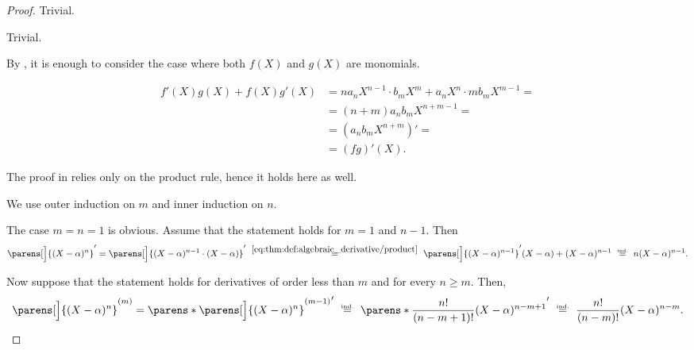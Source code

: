 \begin{proof}
   Trivial.

   Trivial.

   By , it is enough to consider the case where both \( f(X) \) and \( g(X) \) are monomials.

  \begin{align*}
    f'(X) g(X) + f(X) g'(X)
    &=
    n a_n X^{n-1} \cdot b_m X^m + a_n X^n \cdot m b_m X^{m-1}
    = \\ &=
    (n + m) a_n b_m X^{n+m-1}
    = \\ &=
    (a_n b_m X^{n+m})'
    = \\ &=
    (fg)'(X).
  \end{align*}

   The proof in  relies only on the product rule, hence it holds here as well.

   We use outer induction on \( m \) and inner induction on \( n \).

  The case \( m = n = 1 \) is obvious. Assume that the statement holds for \( m = 1 \) and \( n - 1 \). Then
  \begin{equation*}
    \parens[\Big]{ (X - \alpha)^n }'
    =
    \parens[\Big]{ (X - \alpha)^{n-1} \cdot (X - \alpha) }'
    \reloset {\eqref{eq:thm:def:algebraic_derivative/product}} =
    \parens[\Big]{ (X - \alpha)^{n-1} }' (X - \alpha) + (X - \alpha)^{n-1}
    \reloset {\T{ind.}} =
    n (X - \alpha)^{n-1}.
  \end{equation*}

  Now suppose that the statement holds for derivatives of order less than \( m \) and for every \( n \geq m \). Then,
  \begin{equation*}
    \parens[\Big]{ (X - \alpha)^n }^{(m)}
    =
    \parens*{\parens[\Big]{ (X - \alpha)^n }^{(m-1)}}'
    \reloset {\T{ind.}} =
    \parens*{ \frac {n!} {(n - m + 1)!} (X - \alpha)^{n - m + 1} }'
    \reloset {\T{ind.}} =
    \frac {n!} {(n - m)!} (X - \alpha)^{n - m}.
  \end{equation*}
\end{proof}

